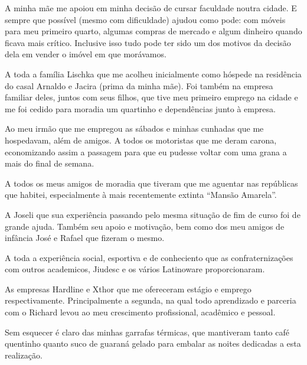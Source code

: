 
A minha mãe me apoiou em minha decisão de cursar faculdade noutra cidade. E sempre que possível (mesmo com dificuldade) ajudou como pode: com móveis para meu primeiro quarto, algumas compras de mercado e algum dinheiro quando ficava mais crítico. Inclusive isso tudo pode ter sido um dos motivos da decisão dela em vender o imóvel em que morávamos.

A toda a família Lischka que me acolheu inicialmente como hóspede na residência do casal Arnaldo e Jacira (prima da minha mãe). Foi também na empresa familiar deles, juntos com seus filhos, que tive meu primeiro emprego na cidade e me foi cedido para moradia um quartinho e dependências junto à empresa.

Ao meu irmão que me empregou as sábados e minhas cunhadas que me hospedavam, além de amigos. A todos os motoristas que me deram carona, economizando assim a passagem para que eu pudesse voltar com uma grana a mais do final de semana.

A todos os meus amigos de moradia que tiveram que me aguentar nas repúblicas que habitei, especialmente à mais recentemente extinta ``Mansão Amarela''.

A Joseli que sua experiência passando pelo mesma situação de fim de curso foi de grande ajuda. Também seu apoio e motivação, bem como dos meu amigos de infância José e Rafael que fizeram o mesmo.

A toda a experiência social, esportiva e de conheciento que as confraternizações com outros academicos, Jiudesc e os vários Latinoware proporcionaram.

As empresas Hardline e Xthor que me ofereceram estágio e emprego respectivamente. Principalmente a segunda, na qual todo aprendizado e parceria com o Richard levou ao meu crescimento profissional, acadêmico e pessoal.

Sem esquecer é claro das minhas garrafas térmicas, que mantiveram tanto café quentinho quanto suco de guaraná gelado para embalar as noites dedicadas a esta realização.
